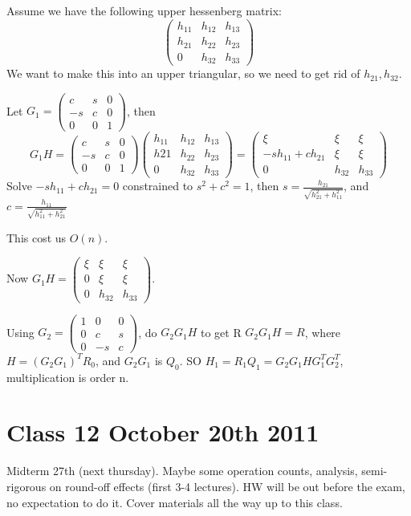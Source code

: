 Assume we have the following upper hessenberg matrix:
$$\begin{pmatrix}
  h_{11} & h_{12} & h_{13}\\
  h_{21} & h_{22} & h_{23}\\
 0 & h_{32} & h_{33}
\end{pmatrix}$$
We want to make this into an upper triangular, so we need to get rid
of $h_{21}, h_{32}$.

Let $G_1 =
\begin{pmatrix}
  c&s&0\\-s&c& 0 \\ 0 & 0 & 1
\end{pmatrix}$, then 
$$G_1H = \begin{pmatrix}
  c&s&0\\-s&c &0 \\ 0 & 0 & 1
\end{pmatrix}\begin{pmatrix}
  h_{11} & h_{12} & h_{13}\\
  h{21} & h_{22} & h_{23}\\
 0 & h_{32} & h_{33}
\end{pmatrix}
=
\begin{pmatrix}
  \xi & \xi & \xi \\
-sh_{11}+ch_{21} & \xi & \xi\\
0 & h_{32} & h_{33}
\end{pmatrix}
$$
Solve $-sh_{11}+ch_{21}=0$ constrained to $s^2+c^2=1$, then
$s=\frac{h_{21}}{\sqrt{h_{21}^2+h_{11}^2}}$, and
$c=\frac{h_{11}}{\sqrt{h_{11}^2+h_{21}^2}}$

This cost us $O(n)$.

Now $G_1H = 
  \begin{pmatrix}
  \xi & \xi & \xi \\
0 & \xi & \xi\\
0 & h_{32} & h_{33}
\end{pmatrix}$. 

Using $G_2=
\begin{pmatrix}
  1 &0 &0\\
0 & c & s\\
0 & -s & c
\end{pmatrix}
$, do $G_2G_1H$ to get R
$  G_2G_1H = R$, where $H=(G_2G_1)^TR_0$, and $G_2G_1$ is $Q_0$.
SO $H_1 = R_1Q_1 = G_2G_1 H G_1^TG_2^T$, multiplication is order n.
\pagebreak

\section{Class 12 October 20th 2011}
\label{sec:class12}
Midterm 27th (next thursday). Maybe some operation counts, analysis,
semi-rigorous on round-off effects (first 3-4 lectures).
HW will be out before the exam, no expectation to do it.
Cover materials all the way up to this class.

